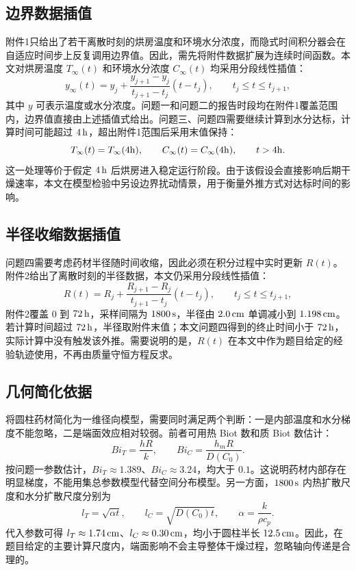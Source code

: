 \documentclass[UTF8,a4paper,12pt]{ctexart}
\begin{document}
\subsection{边界数据插值}
附件1只给出了若干离散时刻的烘房温度和环境水分浓度，而隐式时间积分器会在自适应时间步上反复调用边界值。因此，需先将附件数据扩展为连续时间函数。本文对烘房温度 $T_\infty(t)$ 和环境水分浓度 $C_\infty(t)$ 均采用分段线性插值：
\begin{equation}
  y_\infty(t)=y_j+\frac{y_{j+1}-y_j}{t_{j+1}-t_j}(t-t_j),
  \qquad t_j\le t\le t_{j+1},
\end{equation}
其中 $y$ 可表示温度或水分浓度。问题一和问题二的报告时段均在附件1覆盖范围内，边界值直接由上述插值式给出。问题三、问题四需要继续计算到水分达标，计算时间可能超过 $4\rm\,h$，超出附件1范围后采用末值保持：
\begin{equation}
  T_\infty(t)=T_\infty(4{\rm h}),\qquad C_\infty(t)=C_\infty(4{\rm h}),\qquad t>4{\rm h}.
\end{equation}
这一处理等价于假定 $4\rm\,h$ 后烘房进入稳定运行阶段。由于该假设会直接影响后期干燥速率，本文在模型检验中另设边界扰动情景，用于衡量外推方式对达标时间的影响。

\subsection{半径收缩数据插值}
问题四需要考虑药材半径随时间收缩，因此必须在积分过程中实时更新 $R(t)$。附件2给出了离散时刻的半径数据，本文仍采用分段线性插值：
\begin{equation}
  R(t)=R_j+\frac{R_{j+1}-R_j}{t_{j+1}-t_j}(t-t_j),
  \qquad t_j\le t\le t_{j+1},
\end{equation}
附件2覆盖 $0$ 到 $72\rm\,h$，采样间隔为 $1800\rm\,s$，半径由 $2.0\rm\,cm$ 单调减小到 $1.198\rm\,cm$。若计算时间超过 $72\rm\,h$，半径取附件末值；本文问题四得到的终止时间小于 $72\rm\,h$，实际计算中没有触发该外推。需要说明的是，$R(t)$ 在本文中作为题目给定的经验轨迹使用，不再由质量守恒方程反求。

\subsection{几何简化依据}
将圆柱药材简化为一维径向模型，需要同时满足两个判断：一是内部温度和水分梯度不能忽略，二是端面效应相对较弱。前者可用热 Biot 数和质 Biot 数估计：
\begin{equation}
  Bi_T=\frac{hR}{k},\qquad Bi_C=\frac{h_mR}{D(C_0)}.
\end{equation}
按问题一参数估计，$Bi_T\approx1.389$、$Bi_C\approx3.24$，均大于 $0.1$。这说明药材内部存在明显梯度，不能用集总参数模型代替空间分布模型。另一方面，$1800\rm\,s$ 内热扩散尺度和水分扩散尺度分别为
\begin{equation}
  l_T=\sqrt{\alpha t},\qquad l_C=\sqrt{D(C_0)t},\qquad \alpha=\frac{k}{\rho c_p}.
\end{equation}
代入参数可得 $l_T\approx1.74\rm\,cm$、$l_C\approx0.30\rm\,cm$，均小于圆柱半长 $12.5\rm\,cm$。因此，在题目给定的主要计算尺度内，端面影响不会主导整体干燥过程，忽略轴向传递是合理的。
\end{document}

